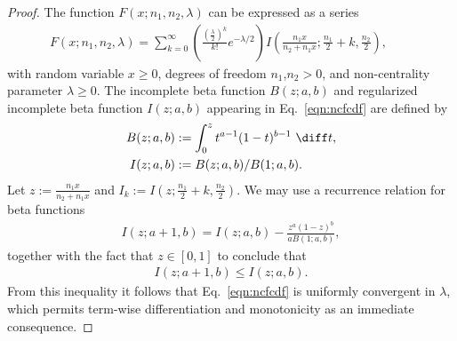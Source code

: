 \begin{proof}
The function $F(x;n_1,n_2,\lambda)$ can be expressed as a series
\begin{align}
    F(x;n_1,n_2,\lambda) = \sum_{k=0}^{\infty} \left( \frac{\left(\frac{\lambda}{2}\right)^k}{k!}e^{-\lambda/2} \right) I\left(\frac{n_1 x}{n_2+n_1x};\frac{n_1}{2}+k,\frac{n_2}{2}\right), \quad\quad  \label{eqn:ncfcdf}
\end{align}
with random variable $x\geq 0$, degrees of freedom $n_1$,$n_2 >0$, and non-centrality parameter $\lambda \geq 0$. The incomplete beta function $B(z;a,b)$ and regularized incomplete beta function $I(z;a,b)$ appearing in Eq.~\eqref{eqn:ncfcdf} are defined by
\begin{align}
 B(z;a,b) &:= \int_0^z t^{a-1} (1-t)^{b-1}~\diff t ,  \\
 I(z;a,b) &:= B(z;a,b)/B(1;a,b).
\end{align}
Let $z:= \frac{n_1 x}{n_2 + n_1 x}$ and $I_k := I(z;\frac{n_1}{2}+k,\frac{n_2}{2})$. We may use a recurrence relation for beta functions \cite{stegun64} 
\begin{align}
    I(z;a+1,b) = I(z;a,b) - \frac{z^a(1-z)^b}{aB(1;a,b)},
\end{align}
together with the fact that $z\in[0,1]$ to  conclude  that 
\begin{align}
   I(z;a+1,b) \leq I(z;a,b).
\end{align}
From this inequality it follows that Eq.~\eqref{eqn:ncfcdf} is uniformly convergent in $\lambda$, which permits term-wise differentiation and monotonicity as an immediate consequence. 


\end{proof}
